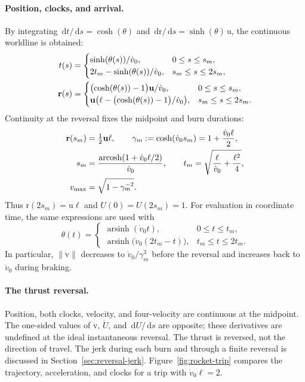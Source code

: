 \documentclass[11pt]{article}
\newcommand{\pv}[1]{{#1}}
\newcommand{\vstyle}[1]{{\bm{\mathrm{#1}}}}
\newcommand{\pU}{\pv{U}}
\numberwithin{equation}{section}
\newcommand{\br}{\vstyle{r}}
\newcommand{\bv}{\vstyle{v}}
\newcommand{\bu}{\vstyle{u}}
\newcommand{\dd}{\,\mathrm d}
\begin{document}
\paragraph{Position, clocks, and arrival.}
By integrating $\dd t/\dd s=\cosh(\theta)$ and
$\dd\br/\dd s=\sinh(\theta)\,\bu$, the continuous worldline is obtained:
\begin{align}
 t(s)&=\begin{cases}
  \sinh(\theta(s))/\dot v_0,&0\le s\le s_m,\\
  2t_m-\sinh(\theta(s))/\dot v_0,&s_m\le s\le2s_m,
 \end{cases}\notag\\
 \br(s)&=\begin{cases}
  \bigl(\cosh(\theta(s))-1\bigr)\bu/\dot v_0,&0\le s\le s_m,\\
  \bu\bigl(\ell-\bigl(\cosh(\theta(s))-1\bigr)/\dot v_0\bigr),
    &s_m\le s\le2s_m.
 \end{cases}
 \label{eq:rocket-worldline}
\end{align}
Continuity at the reversal fixes the midpoint and burn durations:
\begin{align}
 \br(s_m)&=\tfrac12\bu \ell,\qquad
 \gamma_m:=\cosh(\dot v_0s_m)=1+\frac{\dot v_0\ell}{2},\notag\\
 s_m&=\frac{\operatorname{arcosh}(1+\dot v_0\ell/2)}{\dot v_0},\qquad
 t_m=\sqrt{\frac{\ell}{\dot v_0}+\frac{\ell^2}{4}},\notag\\
 v_{\max}&=\sqrt{1-\gamma_m^{-2}}.
 \label{eq:rocket-trip-times}
\end{align}
Thus $\br(2s_m)=\bu \ell$ and $\pU(0)=\pU(2s_m)=1$.
For evaluation in coordinate time, the same expressions are used with
\[
 \theta(t)=\begin{cases}
  \operatorname{arsinh}(\dot v_0t),&0\le t\le t_m,\\
  \operatorname{arsinh}\bigl(\dot v_0(2t_m-t)\bigr),&t_m\le t\le2t_m.
 \end{cases}
\]
In particular, $\lVert\dot{\bv}\rVert$ decreases to
$\dot v_0/\gamma_m^3$ before the reversal and increases back to
$\dot v_0$ during braking.

\paragraph{The thrust reversal.}
Position, both clocks, velocity, and four-velocity are continuous at the
midpoint. The one-sided values of $\dot{\bv}$, $\dot\pU$, and
$\dd\pU/\dd s$ are opposite; these derivatives are undefined at the ideal
instantaneous reversal. The thrust is reversed, not the direction of travel.
The jerk during each burn and through a finite reversal is discussed in
Section~\ref{sec:reversal-jerk}.
Figure~\ref{fig:rocket-trip} compares the trajectory, acceleration, and
clocks for a trip with $\dot v_0\ell=2$.
\end{document}
